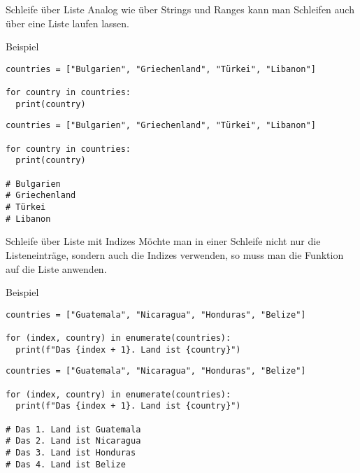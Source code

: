 \begin{fragile}
\begin{block}{Schleife über Liste}
\vspace{2pt}
Analog wie über Strings und Ranges kann man Schleifen auch über eine Liste laufen lassen.  
\end{block}
\vspace{12pt}
\pause 

\begin{exampleblock}{Beispiel}
\vspace{2pt}
\begin{overprint}
\begin{verbatim}
countries = ["Bulgarien", "Griechenland", "Türkei", "Libanon"]

for country in countries:
  print(country)
\end{verbatim}
\begin{verbatim}
countries = ["Bulgarien", "Griechenland", "Türkei", "Libanon"]

for country in countries:
  print(country)
  
# Bulgarien
# Griechenland
# Türkei
# Libanon
\end{verbatim}
\end{overprint}
\end{exampleblock}
\end{fragile}


\begin{fragile}
\begin{block}{Schleife über Liste mit Indizes}
\vspace{2pt}
Möchte man in einer Schleife nicht nur die Listeneinträge, sondern auch die Indizes verwenden, so muss man die Funktion  auf die Liste anwenden. 
\end{block}
\vspace{12pt}
\pause 

\begin{exampleblock}{Beispiel}
\vspace{2pt}
\begin{overprint}
\begin{verbatim}
countries = ["Guatemala", "Nicaragua", "Honduras", "Belize"]

for (index, country) in enumerate(countries):
  print(f"Das {index + 1}. Land ist {country}")
\end{verbatim}
\begin{verbatim}
countries = ["Guatemala", "Nicaragua", "Honduras", "Belize"]

for (index, country) in enumerate(countries):
  print(f"Das {index + 1}. Land ist {country}")

# Das 1. Land ist Guatemala
# Das 2. Land ist Nicaragua
# Das 3. Land ist Honduras
# Das 4. Land ist Belize
\end{verbatim}
\end{overprint}
\end{exampleblock}
\end{fragile}


